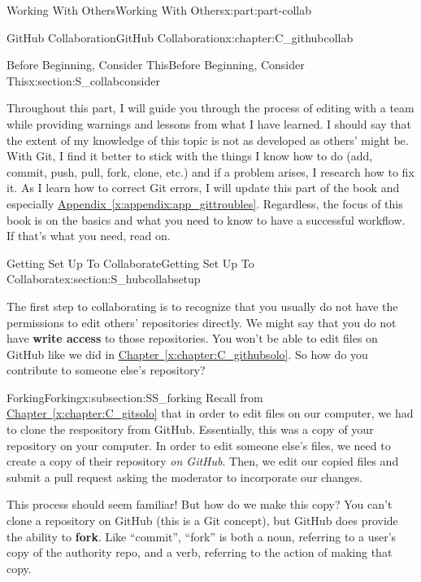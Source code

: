 \documentclass[oneside,10pt,]{book}
\newcommand{\xreffont}{\relax}
\newcommand{\terminology}[1]{\textbf{#1}}
\begin{document}
\begin{partptx}{Working With Others}{}{Working With Others}{}{}{x:part:part-collab}
\begin{chapterptx}{GitHub Collaboration}{}{GitHub Collaboration}{}{}{x:chapter:C_githubcollab}
\begin{sectionptx}{Before Beginning, Consider This}{}{Before Beginning, Consider This}{}{}{x:section:S_collabconsider}
\par
Throughout this part, I will guide you through the process of editing with a team while providing warnings and lessons from what I have learned. I should say that the extent of my knowledge of this topic is not as developed as others' might be. With Git, I find it better to stick with the things I know how to do (add, commit, push, pull, fork, clone, etc.) and if a problem arises, I research how to fix it. As I learn how to correct Git errors, I will update this part of the book and especially \hyperref[x:appendix:app_gittroubles]{Appendix~{\xreffont\ref{x:appendix:app_gittroubles}}}. Regardless, the focus of this book is on the basics and what you need to know to have a successful workflow. If that's what you need, read on.%
\end{sectionptx}
%
%
\typeout{************************************************}
\typeout{************************************************}
%
\begin{sectionptx}{Getting Set Up To Collaborate}{}{Getting Set Up To Collaborate}{}{}{x:section:S_hubcollabsetup}
%
%
\begin{introduction}{}%
The first step to collaborating is to recognize that you usually do not have the permissions to edit others' repositories directly. We might say that you do not have \terminology{write access} to those repositories. You won't be able to edit files on GitHub like we did in \hyperref[x:chapter:C_githubsolo]{Chapter~{\xreffont\ref{x:chapter:C_githubsolo}}}. So how do you contribute to someone else's repository?%
\end{introduction}%
%
%
\typeout{************************************************}
\typeout{************************************************}
%
\begin{subsectionptx}{Forking}{}{Forking}{}{}{x:subsection:SS_forking}
%
%
Recall from \hyperref[x:chapter:C_gitsolo]{Chapter~{\xreffont\ref{x:chapter:C_gitsolo}}} that in order to edit files on our computer, we had to clone the respository from GitHub. Essentially, this was a copy of your repository on your computer. In order to edit someone else's files, we need to create a copy of their repository \emph{on GitHub}. Then, we edit our copied files and submit a pull request asking the moderator to incorporate our changes.%
\par
This process should seem familiar! But how do we make this copy? You can't clone a repository on GitHub (this is a Git concept), but GitHub does provide the ability to \terminology{fork}. Like ``commit'', ``fork'' is both a noun, referring to a user's copy of the authority repo, and a verb, referring to the action of making that copy.%

\end{subsectionptx}
\end{sectionptx}
\end{chapterptx}
\end{partptx}
\end{document}

